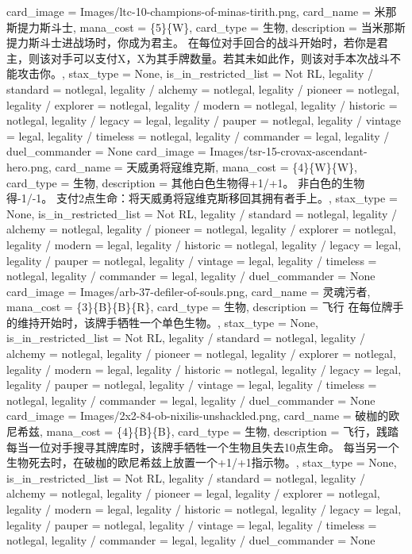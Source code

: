 \documentclass[lang = cn, color = black, 10pt]{AllThatStax}
\begin{document}
\card
{
	card_image = Images/ltc-10-champions-of-minas-tirith.png,
	card_name = 米那斯提力斯斗士,
	mana_cost = \{5\}\{W\},
	card_type = 生物,
	description = 当米那斯提力斯斗士进战场时，你成为君主。
	在每位对手回合的战斗开始时，若你是君主，则该对手可以支付{X}，X为其手牌数量。若其未如此作，则该对手本次战斗不能攻击你。,
	stax_type = None,
	is_in_restricted_list = Not RL,
	legality / standard = notlegal,
	legality / alchemy = notlegal,
	legality / pioneer = notlegal,
	legality / explorer = notlegal,
	legality / modern = notlegal,
	legality / historic = notlegal,
	legality / legacy = legal,
	legality / pauper = notlegal,
	legality / vintage = legal,
	legality / timeless = notlegal,
	legality / commander = legal,
	legality / duel_commander = None
}
\card
{
	card_image = Images/tsr-15-crovax-ascendant-hero.png,
	card_name = 天威勇将寇维克斯,
	mana_cost = \{4\}\{W\}\{W\},
	card_type = 生物,
	description = 其他白色生物得+1/+1。
	非白色的生物得-1/-1。
	支付2点生命：将天威勇将寇维克斯移回其拥有者手上。,
	stax_type = None,
	is_in_restricted_list = Not RL,
	legality / standard = notlegal,
	legality / alchemy = notlegal,
	legality / pioneer = notlegal,
	legality / explorer = notlegal,
	legality / modern = legal,
	legality / historic = notlegal,
	legality / legacy = legal,
	legality / pauper = notlegal,
	legality / vintage = legal,
	legality / timeless = notlegal,
	legality / commander = legal,
	legality / duel_commander = None
}
\card
{
	card_image = Images/arb-37-defiler-of-souls.png,
	card_name = 灵魂污者,
	mana_cost = \{3\}\{B\}\{B\}\{R\},
	card_type = 生物,
	description = 飞行
	在每位牌手的维持开始时，该牌手牺牲一个单色生物。,
	stax_type = None,
	is_in_restricted_list = Not RL,
	legality / standard = notlegal,
	legality / alchemy = notlegal,
	legality / pioneer = notlegal,
	legality / explorer = notlegal,
	legality / modern = legal,
	legality / historic = notlegal,
	legality / legacy = legal,
	legality / pauper = notlegal,
	legality / vintage = legal,
	legality / timeless = notlegal,
	legality / commander = legal,
	legality / duel_commander = None
}
\card
{
	card_image = Images/2x2-84-ob-nixilis-unshackled.png,
	card_name = 破枷的欧尼希兹,
	mana_cost = \{4\}\{B\}\{B\},
	card_type = 生物,
	description = 飞行，践踏
	每当一位对手搜寻其牌库时，该牌手牺牲一个生物且失去10点生命。
	每当另一个生物死去时，在破枷的欧尼希兹上放置一个+1/+1指示物。,
	stax_type = None,
	is_in_restricted_list = Not RL,
	legality / standard = notlegal,
	legality / alchemy = notlegal,
	legality / pioneer = legal,
	legality / explorer = notlegal,
	legality / modern = legal,
	legality / historic = notlegal,
	legality / legacy = legal,
	legality / pauper = notlegal,
	legality / vintage = legal,
	legality / timeless = notlegal,
	legality / commander = legal,
	legality / duel_commander = None
}
\end{document}
